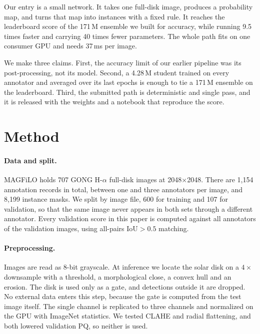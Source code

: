 \documentclass[sigconf]{acmart}
\begin{document}
    Our entry is a small network. It takes one full-disk image, produces a
    probability map, and turns that map into instances with a fixed rule. It
    reaches the leaderboard score of the 171\,M ensemble we built for accuracy,
    while running 9.5 times faster and carrying 40 times fewer parameters. The
    whole path fits on one consumer GPU and needs 37\,ms per image.

    We make three claims. First, the accuracy limit of our earlier pipeline was
    its post-processing, not its model. Second, a 4.28\,M student trained on
    every annotator and averaged over its last epochs is enough to tie a
    171\,M ensemble on the leaderboard. Third, the submitted path is
    deterministic and single pass, and it is released with the weights and a
    notebook that reproduce the score.

\section{Method}\label{sec:method}

\paragraph{Data and split.}
MAGFiLO holds 707 GONG H-$\alpha$ full-disk images at 2048$\times$2048. There
are 1{,}154 annotation records in total, between one and three annotators per
image, and 8{,}199 instance masks. We split by image file, 600 for training and
107 for validation, so that the same image never appears in both sets through a
different annotator. Every validation score in this paper is computed against
all annotators of the validation images, using all-pairs IoU$>0.5$ matching.

\paragraph{Preprocessing.}
Images are read as 8-bit grayscale. At inference we locate the solar disk on a
$4\times$ downsample with a threshold, a morphological close, a convex hull and
an erosion. The disk is used only as a gate, and detections outside it are
dropped. No external data enters this step, because the gate is computed from
the test image itself. The single channel is replicated to three channels and
normalized on the GPU with ImageNet statistics. We tested CLAHE and radial
flattening, and both lowered validation PQ, so neither is used.
\end{document}
